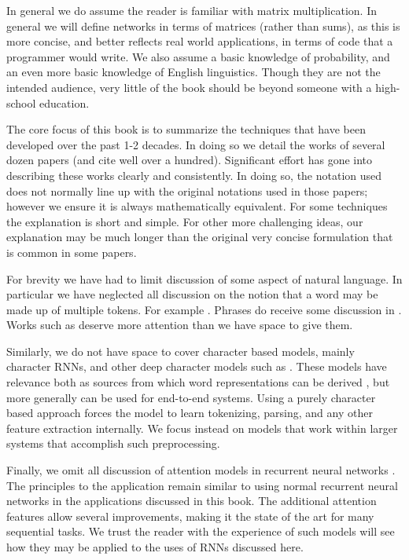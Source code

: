 \documentclass[12pt,parskip]{komatufte}
\begin{document}
In general we do assume the reader is familiar with matrix multiplication.
In general we will define networks in terms of matrices (rather than sums),
as this is more concise, and better reflects real world applications,
in terms of code that a programmer would write.
We also assume a basic knowledge of probability, and an even more basic knowledge of English linguistics.
Though they are not the intended audience, very little of the book should be beyond someone with a high-school education.



The core focus of this book is to summarize the techniques that have been developed over the past 1-2 decades.
In doing so we detail the works of several dozen papers (and cite well over a hundred).
Significant effort has gone into describing these works clearly and consistently.
In doing so, the notation used does not normally line up with the original notations used in those papers; however we ensure it is always mathematically equivalent.
For some techniques the explanation is short and simple.
For other more challenging ideas, our explanation may be much longer than the original very concise formulation that is common in some papers.



For brevity we have had to limit discussion of some aspect of natural language.
In particular we have neglected all discussion on the notion that a word may be made up of multiple tokens.
For example .
Phrases do receive some discussion in .
Works such as  deserve more attention than we have space to give them.

Similarly, we do not have space to cover character based models,
mainly character RNNs, and other deep character models such as .
These models have relevance both as sources from which word representations can be derived ,
but more generally can be used for end-to-end systems.
Using a purely character based approach forces the model to learn tokenizing, parsing, and any other feature extraction internally.
We focus instead on models that work within larger systems that accomplish such preprocessing.

Finally, we omit all discussion of attention models in recurrent neural networks .
The principles to the application remain similar to using normal recurrent neural networks in the applications discussed in this book.
The additional attention features allow several improvements, making it the state of the art for many sequential tasks.
We trust the reader with the experience of such models will see how they may be applied to the uses of RNNs discussed here.
\end{document}
